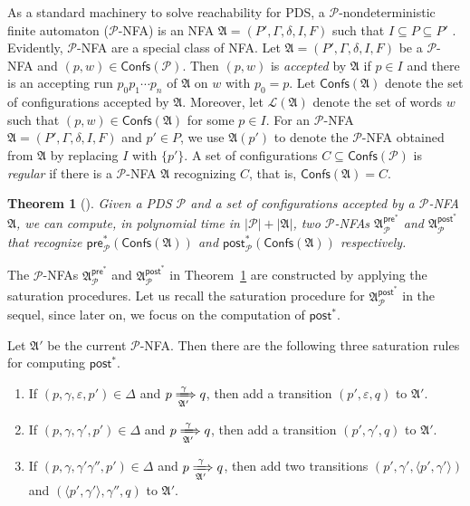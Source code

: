 \documentclass[preprint,12pt]{elsarticle}
\newtheorem{theorem}{Theorem}
\newcommand\Pp{{\mathcal{P} }}
\newcommand\confs{{\mathsf{Confs} }}
\newcommand\pre{{\mathsf{pre} }}
\newcommand\post{{\mathsf{post} }}
\newcommand\Aut{{\mathfrak{A} }}
\newcommand\Lang{{\mathscr{L} }}
\newcommand{\zhilin}[1]{\color{blue} {ZL: #1 :LZ} \color{black}}
\newcommand{\zhilin}[1]{}
\begin{document}
As a standard machinery to solve reachability for PDS, a $\Pp$-nondeterministic finite automaton ($\Pp$-NFA) is an NFA $\Aut=(P', \Gamma, \delta, I, F)$ such that $I \subseteq P \subseteq P'$ \cite{BEM97}.
Evidently, $\Pp$-NFA are a special class of NFA. 
Let $\Aut = (P', \Gamma, \delta, I, F)$ be a  $\Pp$-NFA and  $(p, w) \in \confs(\Pp)$. Then $(p, w)$ is \emph{accepted} by $\Aut$ if $p \in I$ and there is an accepting run $p_0 p_1 \cdots p_n$ of $\Aut$ on $w$ with $p_0 = p$. Let $\confs(\Aut)$ denote the set of configurations accepted by $\Aut$. Moreover, let $\Lang(\Aut)$ denote the set of words $w$ such that $(p, w) \in \confs(\Aut)$ for some $p \in I$. 
For an $\Pp$-NFA $\Aut = (P', \Gamma, \delta, I, F)$ and $p' \in P$, we use $\Aut(p')$ to denote the $\Pp$-NFA obtained from $\Aut$ by replacing $I$ with $\{p'\}$. A set of configurations $C \subseteq \confs(\Pp)$ is \emph{regular} if there is a $\Pp$-NFA $\Aut$ recognizing $C$, that is, $\confs(\Aut) = C$. %

\begin{theorem}[\cite{BEM97}]\label{thm-pds}
	Given  a PDS $\Pp$ and a set of configurations accepted by a $\Pp$-NFA $\Aut$, we can compute, in polynomial time in $|\Pp|+|\Aut|$, two $\Pp$-NFAs $\Aut^{\pre^*}_{\Pp}$  and $\Aut^{\post^*}_{\Pp}$ that recognize $\pre^*_\Pp(\confs(\Aut))$ and $\post^*_\Pp(\confs(\Aut))$ respectively.
\end{theorem}

The $\Pp$-NFAs $\Aut^{\pre^*}_{\Pp}$ and $\Aut^{\post^*}_{\Pp}$ in Theorem~\ref{thm-pds} are constructed by applying the saturation procedures. Let us recall the saturation procedure for $\Aut^{\post^*}_{\Pp}$ in the sequel, since later on, we focus on the computation of $\post^*$.

Let $\Aut'$ be the current $\Pp$-NFA. Then there are the following three saturation rules for computing $\post^*$. 

\smallskip
\fbox
{
\begin{minipage}{0.9\textwidth}
\begin{enumerate}
    \item If $(p, \gamma, \varepsilon, p') \in \Delta$ and $p \xRightarrow[\Aut']{\gamma} q$, then add a transition $(p', \varepsilon, q)$ to $\Aut'$. 
%
    \item If $(p, \gamma, \gamma', p') \in \Delta$ and $p \xRightarrow[\Aut']{\gamma} q$, then add a transition $(p', \gamma', q)$ to $\Aut'$. 
%
    \item If $(p, \gamma, \gamma' \gamma'', p') \in \Delta$ and $p \xRightarrow[\Aut']{\gamma } q$, then add two transitions $(p', \gamma', \langle p', \gamma'\rangle)$ and $(\langle p', \gamma' \rangle, \gamma'', q)$ to $\Aut'$.     
\end{enumerate}
\end{minipage}
}
\end{document}
